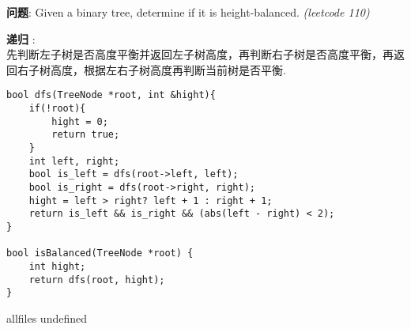 \documentclass{article}
\begin{document}
\begin{CJK}{UTF8}{gbsn}     %

\else
	
\begin{description}
	\item{\textbf{问题}}: Given a binary tree, determine if it is height-balanced. \textit{(leetcode 110)}
	\item{\textbf{递归}} : 
	\\先判断左子树是否高度平衡并返回左子树高度，再判断右子树是否高度平衡，再返回右子树高度，根据左右子树高度再判断当前树是否平衡.
	\begin{lstlisting}
bool dfs(TreeNode *root, int &hight){
	if(!root){
		hight = 0;
		return true;
	}
	int left, right;
	bool is_left = dfs(root->left, left);
	bool is_right = dfs(root->right, right);
	hight = left > right? left + 1 : right + 1;
	return is_left && is_right && (abs(left - right) < 2);
}

bool isBalanced(TreeNode *root) {
	int hight;
	return dfs(root, hight);
}
	\end{lstlisting}
\end{description}

\fi

\ifx allfiles undefined
\end{CJK}
\end{document}
